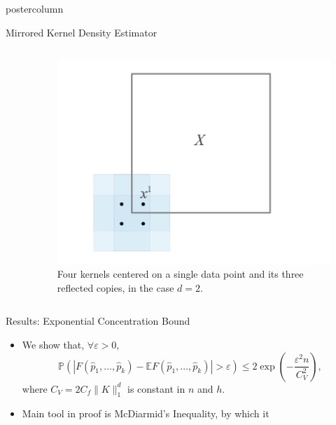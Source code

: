 \documentclass[final,hyperref={pdfpagelabels=false}]{beamer}
\newcommand{\e}{\varepsilon}
\newcommand{\E}{\mathbb{E}}
\renewcommand{\P}{\mathbb{P}}
\begin{document}
\begin{frame}
\begin{columns}
\begin{column}{.32\textwidth}
\begin{beamercolorbox}[center,wd=\textwidth]{postercolumn}
\begin{minipage}[T]{.95\textwidth}
{\begin{block}{Mirrored Kernel Density Estimator}
\begin{columns}
\begin{column}{.63\textwidth}
\begin{enumerate}
                  \end{enumerate}
                \end{column}
                \begin{column}{.36\textwidth}
                  \begin{figure}[h!]
                    \centering
                    \includegraphics[width=\linewidth]{figures/mirror_fig}
                    \caption{\scriptsize Four kernels centered on a single data
                                         point and its three reflected copies,
                                         in the case $d = 2$.}
                    \label{fig:mirror_fig}
                  \end{figure}
                \end{column}
              \end{columns}
            \end{block}
            \vfill
            \begin{block}{\normalsize Results: Exponential Concentration Bound}
              \begin{itemize}
              \item We show that, $\forall \e > 0$,
                \[\P\left(
                        \left| F(\hat p_1,\dots,\hat p_k)
                           - \E F(\hat p_1,\dots,\hat p_k) \right|
                        > \e
                    \right)
                    \leq 2\exp\left( -\frac{\e^2n}{C_V^2} \right),\]
              where $C_V = 2C_f\|K\|_1^d$ is constant in $n$ and $h$.
              \item Main tool in proof is McDiarmid's Inequality, by which it

\end{itemize}
\end{block}}
\end{minipage}
\end{beamercolorbox}
\end{column}
\end{columns}
\end{frame}
\end{document}
